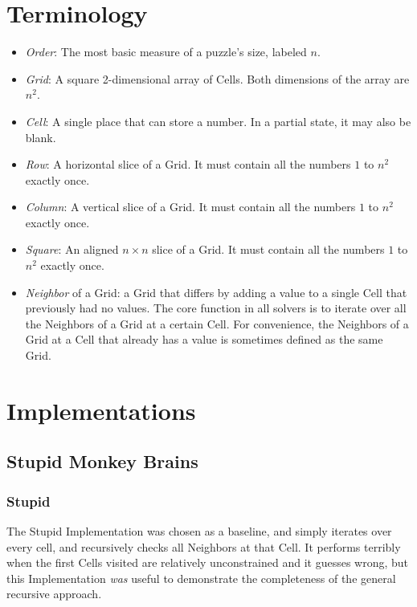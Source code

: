 \documentclass[letterpaper]{article}
\begin{document}
\section{Terminology}

\begin{itemize}
\item \emph{Order}: The most basic measure of a puzzle's size, labeled $n$.
\item \emph{Grid}: A square 2-dimensional array of Cells. Both dimensions of the array are $ n^2 $.
\item \emph{Cell}: A single place that can store a number. In a partial state, it may also be blank.
\item \emph{Row}: A horizontal slice of a Grid. It must contain all the numbers $ 1 $ to $ n^2 $ exactly once.
\item \emph{Column}: A vertical slice of a Grid. It must contain all the numbers $ 1 $ to $ n^2 $ exactly once.
\item \emph{Square}: An aligned $ n \times n $ slice of a Grid. It must contain all the numbers $ 1 $ to $ n^2 $ exactly once.
\item \emph{Neighbor} of a Grid: a Grid that differs by adding a value to a single Cell that previously had no values. The core function in all solvers is to iterate over all the Neighbors of a Grid at a certain Cell. For convenience, the Neighbors of a Grid at a Cell that already has a value is sometimes defined as the same Grid.
\end{itemize}

\section{Implementations}

\subsection{Stupid Monkey Brains}

\subsubsection{Stupid}
The Stupid Implementation was chosen as a baseline, and simply iterates over every cell, and recursively checks all Neighbors at that Cell. It performs terribly when the first Cells visited are relatively unconstrained and it guesses wrong, but this Implementation \emph{was} useful to demonstrate the completeness of the general recursive approach.
\end{document}
